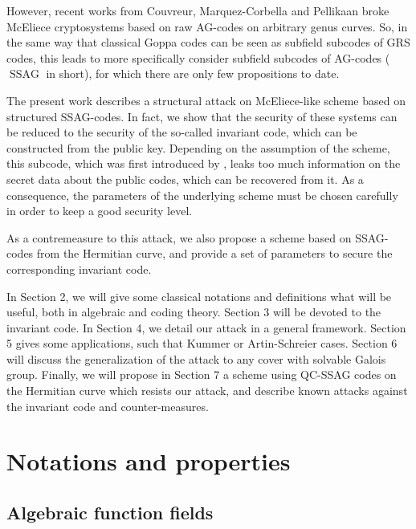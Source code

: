 \documentclass[10pt]{article}
\theoremstyle{definition}
\theoremstyle{definition}
\theoremstyle{definition}
\newcommand{\s}{\vspace{0.3cm}}
\newcommand{\ssag}{\operatorname{SSAG}}
\begin{document}
However, recent works from Couvreur, Marquez-Corbella and Pellikaan \cite{CMP} broke McEliece cryptosystems based on raw AG-codes on arbitrary genus curves. So, in the same way that classical Goppa codes can be seen as subfield subcodes of GRS codes, this leads to more specifically consider subfield subcodes of AG-codes ($\ssag$ in short), for which there are only few propositions to date.

\s

The present work describes a structural attack on McEliece-like scheme based on structured SSAG-codes. In fact, we show that the security of these systems can be reduced to the security of the so-called invariant code, which can be constructed from the public key. Depending on the assumption of the scheme, this subcode, which was first introduced by \cite{LOI}, leaks too much information on the secret data about the public codes, which can be recovered from it. As a consequence, the parameters of the underlying scheme must be chosen carefully in order to keep a good security level.

\s

As a contremeasure to this attack, we also propose a scheme based on SSAG-codes from the Hermitian curve, and provide a set of parameters to secure the corresponding invariant code.

\s

In Section 2, we will give some classical notations and definitions what will be useful, both in algebraic and coding theory. Section 3 will be devoted to the invariant code. In Section 4, we detail our attack in a general framework. Section 5 gives some applications, such that Kummer or Artin-Schreier cases. Section 6 will discuss the generalization of the attack to any cover with solvable Galois group. Finally, we will propose in Section 7 a scheme using QC-SSAG codes on the Hermitian curve which resists our attack, and describe known attacks against the invariant code and counter-measures.


\s

\section{Notations and properties}

\s

\subsection{Algebraic function fields}
\end{document}
